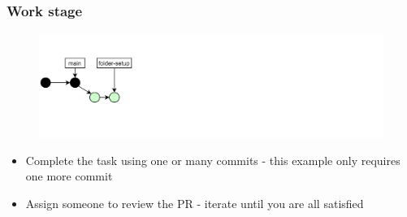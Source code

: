 \documentclass[aspectratio=169]{beamer} %
\begin{document}
\begin{frame}
	\frametitle{Work stage}

	\vspace{-.5cm}
	\begin{minipage}[t][5cm][t]{\textwidth}
		\begin{figure}
			\centering
			\includegraphics[width=\textwidth]{./img/dime-gitflow-network-1-2.png}
		\end{figure}
	\end{minipage}

	\vspace{-.5cm}
	\begin{minipage}[t][5cm][t]{\textwidth}
		\begin{itemize}
			\setlength\itemsep{.5em}
			\item Complete the task using one or many commits
			- this example only requires one more commit
			\item Assign someone to review the PR
			- iterate until you are all satisfied
		\end{itemize}
	\end{minipage}

\end{frame}
\end{document}
